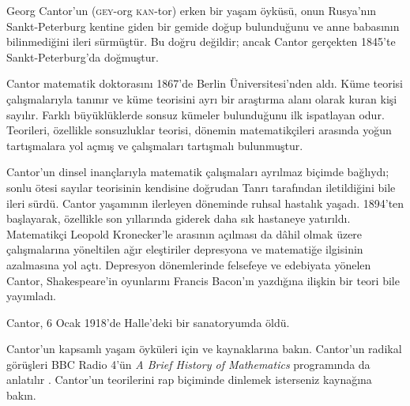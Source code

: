 \documentclass[../../../include/open-logic-section]{subfiles}
\begin{document}



Georg Cantor'un (\textsc{gey}-org \textsc{kan}-tor) erken bir yaşam
öyküsü, onun Rusya'nın Sankt-Peterburg kentine giden bir gemide doğup
bulunduğunu ve anne babasının bilinmediğini ileri sürmüştür. Bu doğru
değildir; ancak Cantor gerçekten 1845'te Sankt-Peterburg'da doğmuştur.

Cantor matematik doktorasını 1867'de Berlin Üniversitesi'nden aldı. Küme
teorisi çalışmalarıyla tanınır ve küme teorisini ayrı bir araştırma alanı
olarak kuran kişi sayılır. Farklı büyüklüklerde sonsuz kümeler bulunduğunu
ilk ispatlayan odur. Teorileri, özellikle sonsuzluklar teorisi, dönemin
matematikçileri arasında yoğun tartışmalara yol açmış ve çalışmaları
tartışmalı bulunmuştur.

Cantor'un dinsel inançlarıyla matematik çalışmaları ayrılmaz biçimde
bağlıydı; sonlu ötesi sayılar teorisinin kendisine doğrudan Tanrı tarafından
iletildiğini bile ileri sürdü. Cantor yaşamının ilerleyen döneminde ruhsal
hastalık yaşadı. 1894'ten başlayarak, özellikle son yıllarında giderek daha
sık hastaneye yatırıldı. Matematikçi Leopold Kronecker'le arasının açılması
da dâhil olmak üzere çalışmalarına yöneltilen ağır eleştiriler depresyona
ve matematiğe ilgisinin azalmasına yol açtı. Depresyon dönemlerinde
felsefeye ve edebiyata yönelen Cantor, Shakespeare'in oyunlarını Francis
Bacon'ın yazdığına ilişkin bir teori bile yayımladı.

Cantor, 6 Ocak 1918'de Halle'deki bir sanatoryumda öldü.

\begin{reading}
Cantor'un kapsamlı yaşam öyküleri için \citet{Dauben1990} ve
\citet{Grattan-Guinness1971} kaynaklarına bakın. Cantor'un radikal
görüşleri BBC Radio 4'ün \emph{A Brief History of Mathematics} programında
da anlatılır \citep{Sautoy2014}. Cantor'un teorilerini rap biçiminde
dinlemek isterseniz \citet{Rose2012} kaynağına bakın.
\end{reading}
\end{document}
